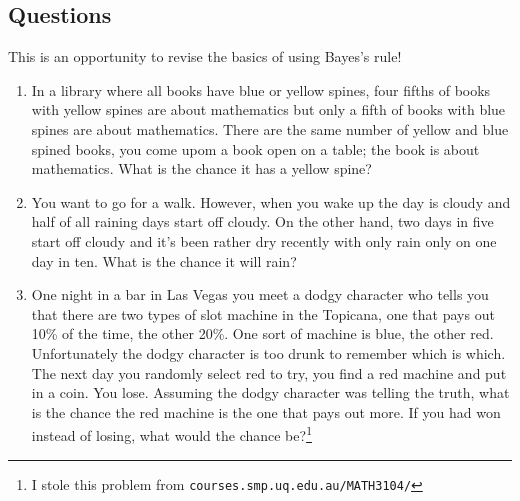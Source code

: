 \documentclass[11pt,a4paper]{scrartcl}
\begin{document}
\subsection*{Questions}

This is an opportunity to revise the basics of using Bayes's rule!

\begin{enumerate}

\item In a library where all books have blue or yellow spines, four
  fifths of books with yellow spines are about mathematics but only a
  fifth of books with blue spines are about mathematics. There are the
  same number of yellow and blue spined books, you come upom a book
  open on a table; the book is about mathematics. What is the chance
  it has a yellow spine?

\item You want to go for a walk. However, when you wake up the day is
  cloudy and half of all raining days start off cloudy. On the other
  hand, two days in five start off cloudy and it's been rather dry
  recently with only rain only on one day in ten. What is the chance
  it will rain?
  
\item One night in a bar in Las Vegas you meet a dodgy character who
  tells you that there are two types of slot machine in the Topicana,
  one that pays out 10\% of the time, the other 20\%. One sort of
  machine is blue, the other red. Unfortunately the dodgy character is
  too drunk to remember which is which. The next day you randomly
  select red to try, you find a red machine and put in a coin. You
  lose. Assuming the dodgy character was telling the truth, what is
  the chance the red machine is the one that pays out more. If you had
  won instead of losing, what would the chance be?\footnote{I stole
    this problem from \texttt{courses.smp.uq.edu.au/MATH3104/}}

\end{enumerate}
\end{document}
